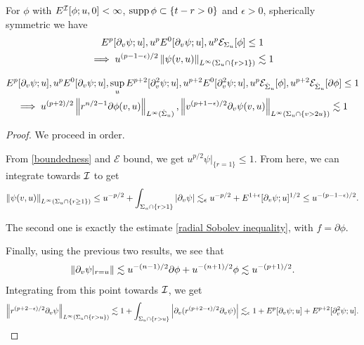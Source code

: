 \documentclass[11pt, oneside]{amsart}
\begin{document}
\begin{lemma}\label{l infty estimates from l2}
	For $\phi$ with $E^{\mathcal{I}}[\phi;u,0]<\infty$, $\operatorname{supp}\phi\subset\{t-r>0\}$ and $\epsilon>0$, spherically symmetric we have 
	\begin{equation*}
		\begin{gathered}
			E^p[\partial_v\psi;u],u^pE^0[\partial_v\psi;u],u^p\mathcal{E}_{\Sigma_u}[\phi]\leq1\\
			\implies u^{(p-1-\epsilon)/2}\left\lVert \psi(v,u)\right\rVert_{L^\infty(\Sigma_u\cap\{r>1\})}\lesssim 1
		\end{gathered}
	\end{equation*}
	
	\begin{equation*}
		\begin{gathered}
			E^p[\partial_v\psi;u],u^pE^0[\partial_v\psi;u],\sup_uE^{p+2}[\partial_v^2\psi;u],u^{p+2}E^0[\partial_v^2\psi;u],u^p\mathcal{E}_{\hat{\Sigma}_u}[\phi],u^{p+2}\mathcal{E}_{\hat{\Sigma}_u}[\partial\phi]\leq1\\
			\implies u^{(p+2)/2}\left\lVert r^{n/2-1}\partial\phi(v,u)\right\rVert_{L^\infty(\hat{\Sigma}_u)},\left\lVert v^{(p+1-\epsilon)/2}\partial_v\psi(v,u)\right\rVert_{L^\infty(\Sigma_u\cap \{v>2u\})}\lesssim 1
		\end{gathered}
	\end{equation*}	
\end{lemma}
\begin{proof}
	We proceed in order.
	
	From \cref{boundedness} and $\mathcal{E}$ bound, we get $u^{p/2}\psi|_{\{r=1\}}\leq1$. From here, we can integrate towards $\mathcal{I}$ to get
	\begin{equation*}
		\begin{gathered}
			\left\lVert \psi(v,u)\right\rVert_{L^\infty(\Sigma_u\cap\{r\geq1\})}\leq u^{-p/2}+\int_{\Sigma_u\cap\{r>1\}}\left\lvert \partial_v\psi\right\rvert\lesssim_\epsilon u^{-p/2}+E^{1+\epsilon}[\partial_v\psi;u]^{1/2}\leq u^{-(p-1-\epsilon)/2}.
		\end{gathered}
	\end{equation*}
	
	
	The second one is exactly the estimate \cref{radial Sobolev inequality}, with $f=\partial\phi$.
	
	Finally, using the previous two results, we see that
	\begin{equation*}
		\begin{gathered}
			\left\lVert \partial_v\psi|_{r=u}\right\rVert\lesssim u^{-(n-1)/2}\partial\phi+u^{-(n+1)/2}\phi\lesssim u^{-(p+1)/2}.
		\end{gathered}
	\end{equation*}
	Integrating from this point towards $\mathcal{I}$, we get
	\begin{equation*}
		\begin{gathered}
			\left\lVert r^{(p+2-\epsilon)/2}\partial_v\psi\right\rVert_{L^\infty(\Sigma_u\cap\{r>u\})}\lesssim 1+\int_{\Sigma_u\cap\{r>u\}}\left\lvert \partial_v(r^{(p+2-\epsilon)/2}\partial_v\psi)\right\rvert\lesssim_\epsilon 1+E^p[\partial_v\psi;u]+E^{p+2}[\partial_v^2\psi;u].
		\end{gathered}
	\end{equation*}
\end{proof}	
\end{document}
